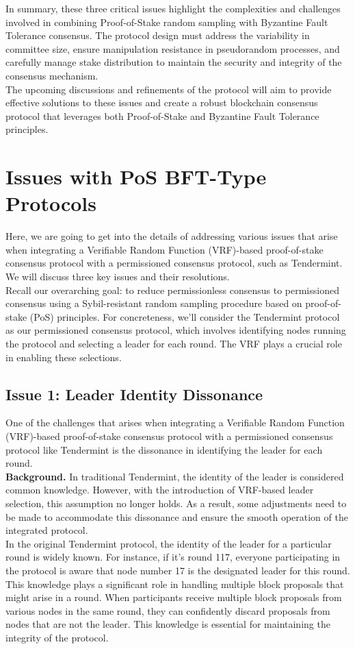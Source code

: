 In summary, these three critical issues highlight the complexities and challenges involved in combining Proof-of-Stake random sampling with Byzantine Fault Tolerance consensus. The protocol design must address the variability in committee size, ensure manipulation resistance in pseudorandom processes, and carefully manage stake distribution to maintain the security and integrity of the consensus mechanism.\\
The upcoming discussions and refinements of the protocol will aim to provide effective solutions to these issues and create a robust blockchain consensus protocol that leverages both Proof-of-Stake and Byzantine Fault Tolerance principles.

\section{Issues with PoS BFT-Type Protocols}
Here, we are going to get into the details of addressing various issues that arise when integrating a Verifiable Random Function (VRF)-based proof-of-stake consensus protocol with a permissioned consensus protocol, such as Tendermint. We will discuss three key issues and their resolutions.\\
Recall our overarching goal: to reduce permissionless consensus to permissioned consensus using a Sybil-resistant random sampling procedure based on proof-of-stake (PoS) principles. For concreteness, we'll consider the Tendermint protocol as our permissioned consensus protocol, which involves identifying nodes running the protocol and selecting a leader for each round. The VRF plays a crucial role in enabling these selections.

\subsection{Issue 1: Leader Identity Dissonance}
One of the challenges that arises when integrating a Verifiable Random Function (VRF)-based proof-of-stake consensus protocol with a permissioned consensus protocol like Tendermint is the dissonance in identifying the leader for each round.\\

\noindent
\textbf{Background.} In traditional Tendermint, the identity of the leader is considered common knowledge. However, with the introduction of VRF-based leader selection, this assumption no longer holds. As a result, some adjustments need to be made to accommodate this dissonance and ensure the smooth operation of the integrated protocol.\\
In the original Tendermint protocol, the identity of the leader for a particular round is widely known. For instance, if it's round 117, everyone participating in the protocol is aware that node number 17 is the designated leader for this round. This knowledge plays a significant role in handling multiple block proposals that might arise in a round. When participants receive multiple block proposals from various nodes in the same round, they can confidently discard proposals from nodes that are not the leader. This knowledge is essential for maintaining the integrity of the protocol.\\

